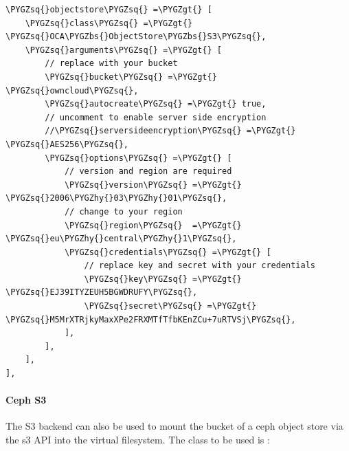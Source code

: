 \documentclass[letterpaper,10pt,english]{sphinxmanual}
\def\PYGZbs{\char`\\}
\def\PYGZgt{\char`\>}
\def\PYGZhy{\char`\-}
\def\PYGZsq{\char`\'}
\renewcommand\PYGZsq{\textquotesingle}
\begin{document}
\begin{Verbatim}[commandchars=\\\{\}]
\PYGZsq{}objectstore\PYGZsq{} =\PYGZgt{} [
    \PYGZsq{}class\PYGZsq{} =\PYGZgt{} \PYGZsq{}OCA\PYGZbs{}ObjectStore\PYGZbs{}S3\PYGZsq{},
    \PYGZsq{}arguments\PYGZsq{} =\PYGZgt{} [
        // replace with your bucket
        \PYGZsq{}bucket\PYGZsq{} =\PYGZgt{} \PYGZsq{}owncloud\PYGZsq{},
        \PYGZsq{}autocreate\PYGZsq{} =\PYGZgt{} true,
        // uncomment to enable server side encryption
        //\PYGZsq{}serversideencryption\PYGZsq{} =\PYGZgt{} \PYGZsq{}AES256\PYGZsq{},
        \PYGZsq{}options\PYGZsq{} =\PYGZgt{} [
            // version and region are required
            \PYGZsq{}version\PYGZsq{} =\PYGZgt{} \PYGZsq{}2006\PYGZhy{}03\PYGZhy{}01\PYGZsq{},
            // change to your region
            \PYGZsq{}region\PYGZsq{}  =\PYGZgt{} \PYGZsq{}eu\PYGZhy{}central\PYGZhy{}1\PYGZsq{},
            \PYGZsq{}credentials\PYGZsq{} =\PYGZgt{} [
                // replace key and secret with your credentials
                \PYGZsq{}key\PYGZsq{} =\PYGZgt{} \PYGZsq{}EJ39ITYZEUH5BGWDRUFY\PYGZsq{},
                \PYGZsq{}secret\PYGZsq{} =\PYGZgt{} \PYGZsq{}M5MrXTRjkyMaxXPe2FRXMTfTfbKEnZCu+7uRTVSj\PYGZsq{},
            ],
        ],
    ],
],
\end{Verbatim}


\paragraph{Ceph S3}
\label{enterprise_external_storage/s3_swift_as_primary_object_store_configuration:ceph-s3}
The S3 backend can also be used to mount the bucket of a ceph object store via the s3 API
into the virtual filesystem. The class to be used is :
\end{document}
